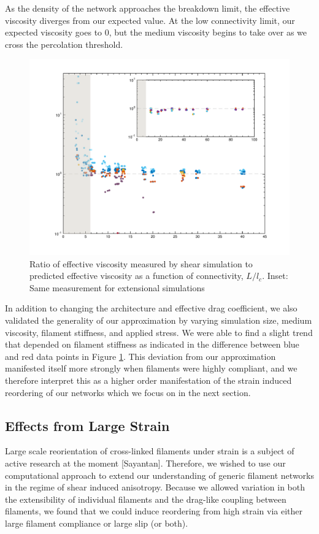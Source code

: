 \documentclass[pre,reprint]{revtex4-1}
\begin{document}
As the density of the network approaches the breakdown limit, the effective viscosity diverges from our expected value.  At the low connectivity limit, our expected viscosity goes to 0, but the medium viscosity begins to take over as we cross the percolation threshold.  
\begin{figure}[h!]
\centering
\includegraphics[width=\hsize]{eff_vic_master}
\caption{\label{fig:effvic}Ratio of effective viscosity measured by shear simulation to predicted effective viscosity as a function of connectivity, $L/l_c$. Inset: Same measurement for extensional simulations }
\end{figure}

In addition to changing the architecture and effective drag coefficient, we also validated the generality of our approximation by varying simulation size, medium viscosity, filament stiffness, and applied stress.  We were able to find a slight trend that depended on filament stiffness as indicated in the difference between blue and red data points in Figure \ref{fig:effvic}.  This deviation from our approximation manifested itself more strongly when filaments were highly compliant, and we therefore interpret this as a higher order manifestation of the strain induced reordering of our networks which we focus on in the next section.



\subsection{Effects from Large Strain}

Large scale reorientation of cross-linked filaments under strain is a subject of active research at the moment [Sayantan].  Therefore, we wished to use our computational approach to extend our understanding of generic filament networks in the regime of shear induced anisotropy.  Because we allowed variation in both the extensibility of individual filaments and the drag-like coupling between filaments, we found that we could induce reordering from high strain via either large filament compliance or large slip (or both).  
\end{document}
